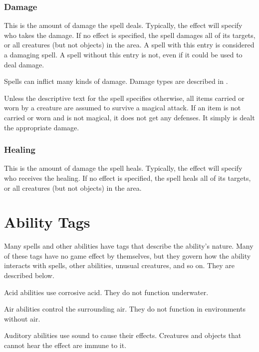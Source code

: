         \subsubsection{Damage}
            This is the amount of damage the spell deals.
            Typically, the effect will specify who takes the damage.
            If no effect is specified, the spell damages all of its targets, or all creatures (but not objects) in the area.
            A spell with this entry is considered a damaging spell.
            A spell without this entry is not, even if it could be used to deal damage.

            Spells can inflict many kinds of damage.
            Damage types are described in .

             Unless the descriptive text for the spell specifies otherwise, all items carried or worn by a creature are assumed to survive a magical attack.
            If an item is not carried or worn and is not magical, it does not get any defenses.
            It simply is dealt the appropriate damage.

        \subsubsection{Healing}
            This is the amount of damage the spell heals.
            Typically, the effect will specify who receives the healing.
            If no effect is specified, the spell heals all of its targets, or all creatures (but not objects) in the area.

\section{Ability Tags}\label{Ability Tags}

    Many spells and other abilities have tags that describe the ability's nature.
    Many of these tags have no game effect by themselves, but they govern how the ability interacts with spells, other abilities, unusual creatures, and so on.
    They are described below.

     Acid abilities use corrosive acid.
    They do not function underwater.

     Air abilities control the surrounding air.
    They do not function in environments without air.

     Auditory abilities use sound to cause their effects.
    Creatures and objects that cannot hear the effect are immune to it.

